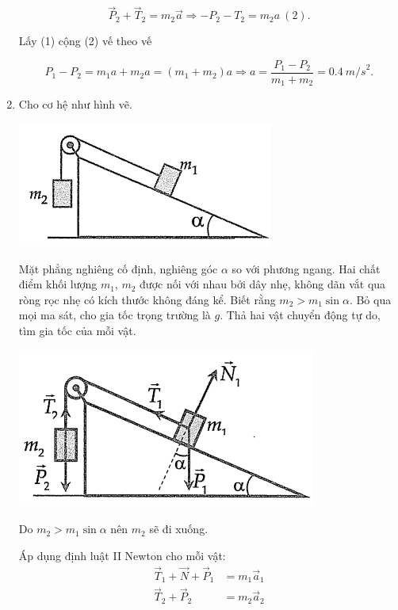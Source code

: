\begin{enumerate}[label=\bfseries Bài \arabic*:]
{	$$\vec P_2 + \vec T_2 = m_2 \vec a \Rightarrow - P_2 - T_2 = m_2a\ (2).$$
	
	Lấy (1) cộng (2) vế theo vế
	
	$$ P_1 - P_2 = m_1 a + m_2 a = (m_1+ m_2)a \Rightarrow a = \dfrac{P_1 - P_2}{m_1 + m_2} = \SI{0,4}{m/s}^2.$$
	
}


\item {}


{Cho cơ hệ như hình vẽ.
	\begin{center}
		\includegraphics[scale=0.8]{../figs/VN10-2021-PH-TP012-3.png}
	\end{center}
	Mặt phẳng nghiêng cố định, nghiêng góc $\alpha$ so với phương ngang. Hai chất điểm khối lượng $m_1$, $m_2$ được nối với nhau bởi dây nhẹ, không dãn vắt qua ròng rọc nhẹ có kích thước không đáng kể. Biết rằng $m_2 > m_1 \sin \alpha$. Bỏ qua mọi ma sát, cho gia tốc trọng trường là $g$. Thả hai vật chuyển động tự do, tìm gia tốc của mỗi vật.
}

\hideall
{	\begin{center}
		\includegraphics[scale=0.8]{../figs/VN10-2021-PH-TP012-4.png}
	\end{center}
	
	Do $m_2 > m_1 \sin \alpha$ nên $m_2$ sẽ đi xuống.
	
	Áp dụng định luật II Newton cho mỗi vật:
	\begin{align*}
		\vec T_1 + \vec N + \vec P_1 &= m_1 \vec a_1 \\
		\vec T_2 + \vec P_2 &= m_2 \vec a_2
	\end{align*}
	
}
\end{enumerate}
